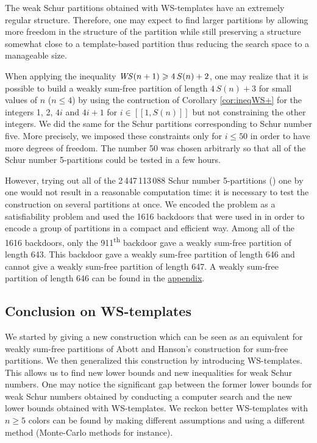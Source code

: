 The weak Schur partitions obtained with WS-templates have an extremely regular structure. Therefore, one may 
expect to find larger partitions by allowing more freedom in the structure of the partition while still preserving a structure 
somewhat close to a template-based partition thus reducing the search space to a manageable size.

When applying the inequality \(\mathit{WS}(n+1) \geqslant 4 \, S(n) + 2\), one may realize that it is possible to build a weakly 
sum-free partition of length \(4 \, S(n) + 3\) for small values of \(n\) (\(n \leqslant 4\)) by using the contruction of 
Corollary \ref{cor:ineqWS+} for the integers 1, 2, \(4i\) and \(4i+1\) for \(i \in [\![1, S(n)]\!]\) but not 
constraining the other integers. We did the same for the Schur partitions corresponding to Schur number five. More precisely, 
we imposed these constraints only for \(i \leqslant 50\) in order to have more degrees of freedom. The number 50 was chosen 
arbitrarly so that all of the Schur number 5-partitions could be tested in a few hours.

However, trying out all of the 2\,447\,113\,088 Schur number 5-partitions (\cite{Heule2017}) one by one would not result in a 
reasonable computation time: it is necessary to test the construction on several partitions at once. We encoded the problem as a 
satisfiability problem and used the 1616 backdoors that were used in \cite{Heule2017} in order to encode a group of partitions in 
a compact and efficient way. Among all of the 1616 backdoors, only the 911\textsuperscript{th} backdoor gave a weakly sum-free 
partition of length 643. This backdoor gave a weakly sum-free partition of length 646 and cannot give a weakly sum-free 
partition of length 647. A weakly sum-free partition of length 646 can be found in the \hyperref[WS(6)]{appendix}.


\subsection{Conclusion on WS-templates}

We started by giving a new construction which can be seen as an equivalent for weakly sum-free partitions of Abott
and Hanson's construction for sum-free partitions. We then generalized this construction by introducing WS-templates. This
allows us to find new lower bounds and new inequalities for weak Schur numbers. One may notice the significant gap
between the former lower bounds for weak Schur numbers obtained by conducting a computer search and the new lower bounds
obtained with WS-templates. We reckon better WS-templates with \(n \geqslant 5\) colors can be found by making different assumptions 
and using a different method (Monte-Carlo methods for instance).
